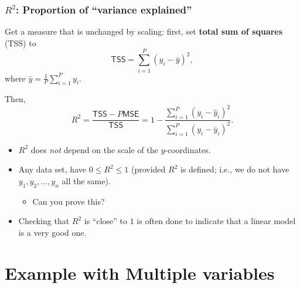 \documentclass{beamer}
\theoremstyle{example}
\begin{document}
\begin{frame}
    \frametitle{$R^2$: Proportion of ``variance explained''}
    Get a measure that is unchanged by scaling: first, set \textbf{total sum of squares} (TSS) to 
    \[\textsf{TSS} = \sum_{i=1}^P(y_i - \bar{y})^2,\]
    where $\bar{y} = \frac{1}{P}\sum_{i=1}^P y_i$.

    \pause 
    Then, 
        \[R^2 = \frac{\textsf{TSS} - P\textsf{MSE}}{\textsf{TSS}} = 1 - \frac{\sum_{i=1}^P(y_i - \hat{y}_i)^2}{\sum_{i=1}^P(y_i - \bar{y}_i)^2}.\]
    \pause
    \begin{itemize}
        \item $R^2$ does \emph{not} depend on the scale of the $y$-coordinates.
        \pause
        \item Any data set, have $0\le R^2\le 1$ (provided $R^2$ is defined; i.e., we do not have $y_1,y_2,\ldots,y_n$ all the same).
        \begin{itemize}
            \item Can you prove this?
        \end{itemize}
        \pause
        \item Checking that $R^2$ is ``close'' to $1$ is often done to indicate that a linear model is a very good one.
    \end{itemize}
\end{frame}

\section{Example with Multiple variables}
\end{document}
